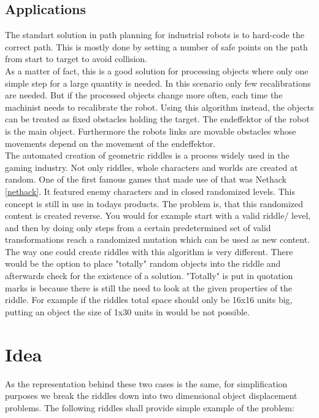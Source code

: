 \subsection{Applications}
The standart solution in path planning for industrial robots is to hard-code the correct path. This is mostly done by setting a number of safe points on the path from start to target to avoid collision. \\
As a matter of fact, this is a good solution for processing objects where only one simple step for a large quantity is needed. In this scenario only few recalibrations are needed. But if the processed objects change more often, each time the machinist needs to recalibrate the robot. Using this algorithm instead, the objects can be treated as fixed obstacles holding the target. The endeffektor of the robot is the main object. Furthermore the robots links are movable obstacles whose movements depend on the movement of the endeffektor. \\
\newline
The automated creation of geometric riddles is a process widely used in the gaming industry. Not only riddles, whole characters and worlds are created at random.
One of the first famous games that made use of that was Nethack \ref{nethack}. It featured enemy characters and in closed randomized levels. This concept is still in use in todays products. The problem is, that this randomized content is created reverse. You would for example start with a valid riddle/ level, and then by doing only steps from a certain predetermined set of valid transformations reach a randomized mutation which can be used as new content.\\
The way one could create riddles with this algorithm is very different. There would be the option to place "totally" random objects into the riddle and afterwards check for the existence of a solution. "Totally" is put in  quotation marks is because there is still the need to look at the given properties of the riddle. For example if the riddles total space should only be 16x16 units big, putting an object the size of 1x30 units in would be not possible.

\section{Idea}
\label{sec:Idea}
As the representation behind these two cases is the same, for simplification purposes we break the riddles down into two dimensional object displacement problems. The following riddles shall provide simple example of the problem:\\

